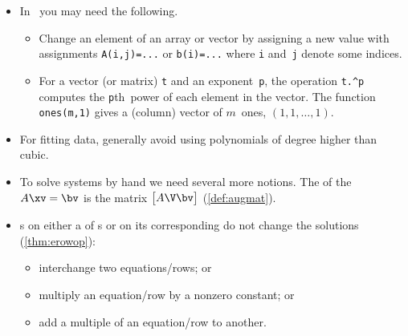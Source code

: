 \begin{itemize}
\itemhi \cref{pro:unisol} use \script\ to solve the matrix-vector system \(A\xv=\bv\), for a ~\(A\): 
\begin{enumerate}
\item form matrix~\(A\) and ~\(\bv\);
\item check \verb|rcond(A)| exists and is not too small, \(1\geq\text{good} >10^{-2} >\text{poor} >10^{-4} >\text{bad} >10^{-8} >\text{terrible}\);
\item if \verb|rcond(A)| is acceptable, then execute \verb|x=A\b| to compute the solution vector~\(\xv\). 
\end{enumerate}
Checking \verb|rcond()| avoids many mistakes in applications.


\item In \script\ you may need the following.
\begin{itemize}
\itemhi \verb|[ ... ; ... ; ... ]| forms both matrices and vectors, or use newlines instead of the semi-colons.
\itemhi \verb|rcond(A)|  of a ~\(A\) \emph{estimates} the reciprocal of the so-called .
\itemhi \verb|x=A\b| computes an `answer' to \(A\xv=\bv\)\,---but it may not be a solution unless \verb|rcond(A)| exists and is not small;
\item Change an element of an array or vector by assigning a new value with assignments \verb|A(i,j)=...| or \verb|b(i)=...| where \verb|i| and~\verb|j| denote some indices.
\item For a vector (or matrix) \verb|t| and an exponent~\verb|p|, the operation \verb|t.^p| computes the \verb|p|th~power of each element in the vector.
\itemme The function \verb|ones(m,1)| gives a (column) vector of \(m\)~ones, \((1,1,\ldots,1)\).
\end{itemize}

\item For fitting data, generally avoid using polynomials of degree higher than cubic.


\item To solve systems by hand we need several more notions.
The  of the  \(A\xv=\bv\) is the matrix \(\begin{bmatrix} A\V \bv \end{bmatrix}\)  (\cref{def:augmat}).

\item {}s on either a  of s or on its corresponding  do not change the solutions (\cref{thm:erowop}):
\begin{itemize}
\item interchange two equations\slash rows; or
\item multiply an equation\slash row by a nonzero constant; or
\item add a multiple of an equation\slash row to another.
\end{itemize}


\end{itemize}
